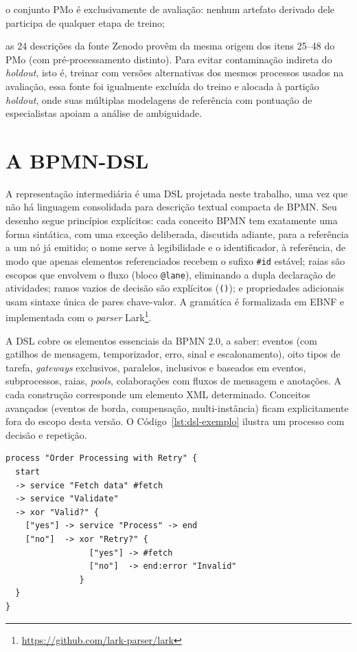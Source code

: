 \begin{alineas}
	\item o conjunto PMo é exclusivamente de avaliação: nenhum artefato derivado dele participa de qualquer etapa de treino;
	\item as 24 descrições da fonte Zenodo \cite{mangler2023textual} provêm da mesma origem dos itens 25--48 do PMo (com pré-processamento distinto). Para evitar contaminação indireta do \textit{holdout}, isto é, treinar com versões alternativas dos mesmos processos usados na avaliação, essa fonte foi igualmente excluída do treino e alocada à partição \textit{holdout}, onde suas múltiplas modelagens de referência com pontuação de especialistas apoiam a análise de ambiguidade.
\end{alineas}

\section{A BPMN-DSL}
\label{sec:dsl}

A representação intermediária é uma DSL projetada neste trabalho, uma vez que não há linguagem consolidada para descrição textual compacta de BPMN. Seu desenho segue princípios explícitos: cada conceito BPMN tem exatamente uma forma sintática, com uma exceção deliberada, discutida adiante, para a referência a um nó já emitido; o nome serve à legibilidade e o identificador, à referência, de modo que apenas elementos referenciados recebem o sufixo \texttt{\#id} estável; raias são escopos que envolvem o fluxo (bloco \texttt{@lane}), eliminando a dupla declaração de atividades; ramos vazios de decisão são explícitos (\texttt{()}); e propriedades adicionais usam sintaxe única de pares chave-valor. A gramática é formalizada em EBNF e implementada com o \textit{parser} Lark\footnote{\url{https://github.com/lark-parser/lark}}.

A DSL cobre os elementos essenciais da BPMN 2.0, a saber: eventos (com gatilhos de mensagem, temporizador, erro, sinal e escalonamento), oito tipos de tarefa, \textit{gateways} exclusivos, paralelos, inclusivos e baseados em eventos, subprocessos, raias, \textit{pools}, colaborações com fluxos de mensagem e anotações. A cada construção corresponde um elemento XML determinado. Conceitos avançados (eventos de borda, compensação, multi-instância) ficam explicitamente fora do escopo desta versão. O Código~\ref{lst:dsl-exemplo} ilustra um processo com decisão e repetição.

\begin{lstlisting}[caption={Exemplo de processo na BPMN-DSL: decisão exclusiva com laço de repetição via referência. Rótulos em inglês conforme a Seção~\ref{subsec:idioma}},label={lst:dsl-exemplo}]
process "Order Processing with Retry" {
  start
  -> service "Fetch data" #fetch
  -> service "Validate"
  -> xor "Valid?" {
    ["yes"] -> service "Process" -> end
    ["no"]  -> xor "Retry?" {
                 ["yes"] -> #fetch
                 ["no"]  -> end:error "Invalid"
               }
  }
}
\end{lstlisting}

